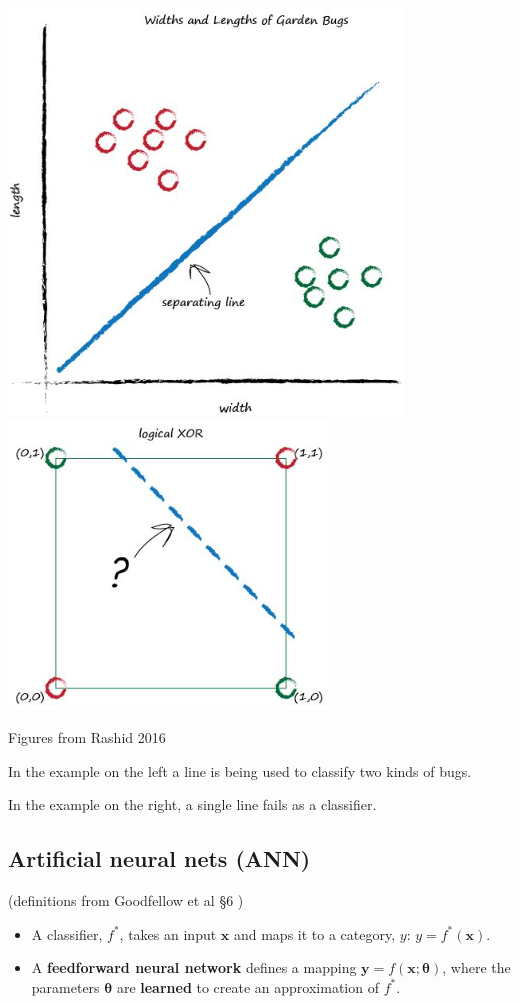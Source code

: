 \documentclass[12pt,letterpaper,noanswers]{exam}
\newcommand{\vc}[1]{\boldsymbol{#1}}
\begin{document}
\includegraphics[scale=0.4]{img/C22rashidbugs.png}
\includegraphics[width=0.4\linewidth]{img/C22rashidxor1.png}

Figures from Rashid 2016 \cite{rashid2016make}

In the example on the left a line is being used to classify two kinds of bugs.

In the example on the right, a single line fails as a classifier.

\subsection*{Artificial neural nets (ANN)}

(definitions from  Goodfellow et al \S 6 \cite{Goodfellow-et-al-2016})

\begin{tcolorbox}

\begin{itemize}
\itemsep0pt
    \item A classifier, $f^*$, takes an input $\vc{x}$ and maps it to a category, $y$: $y = f^*(\vc{x})$.
    \item A \textbf{feedforward neural network} defines a mapping $\vc{y} = f(\vc{x};\vc{\theta})$, where the parameters $\vc{\theta}$ are \textbf{learned} to create an approximation of $f^*$. 
\end{itemize}
\end{tcolorbox}
\end{document}
